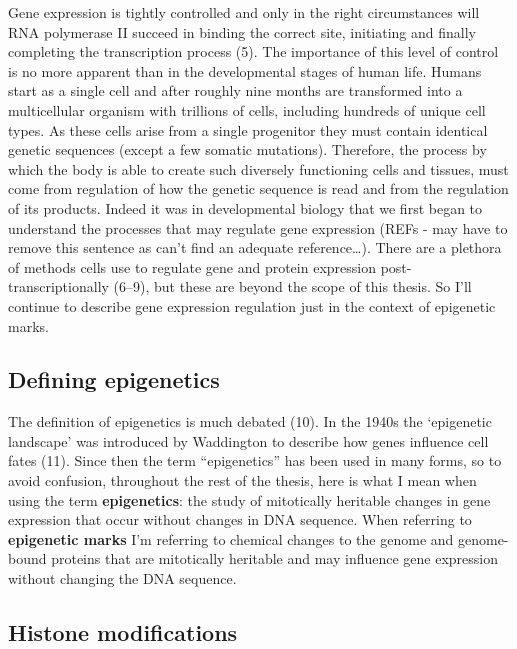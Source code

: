 \documentclass[11pt,twoside]{bristolthesis}
\begin{document}
Gene expression is tightly controlled and only in the right circumstances will RNA polymerase II succeed in binding the correct site, initiating and finally completing the transcription process (5). The importance of this level of control is no more apparent than in the developmental stages of human life. Humans start as a single cell and after roughly nine months are transformed into a multicellular organism with trillions of cells, including hundreds of unique cell types. As these cells arise from a single progenitor they must contain identical genetic sequences (except a few somatic mutations). Therefore, the process by which the body is able to create such diversely functioning cells and tissues, must come from regulation of how the genetic sequence is read and from the regulation of its products. Indeed it was in developmental biology that we first began to understand the processes that may regulate gene expression (REFs - may have to remove this sentence as can't find an adequate reference\ldots). There are a plethora of methods cells use to regulate gene and protein expression post-transcriptionally (6--9), but these are beyond the scope of this thesis. So I'll continue to describe gene expression regulation just in the context of epigenetic marks.

\hypertarget{defining-epigenetics}{%
\subsection{Defining epigenetics}\label{defining-epigenetics}}

The definition of epigenetics is much debated (10). In the 1940s the `epigenetic landscape' was introduced by Waddington to describe how genes influence cell fates (11). Since then the term ``epigenetics'' has been used in many forms, so to avoid confusion, throughout the rest of the thesis, here is what I mean when using the term \textbf{epigenetics}: the study of mitotically heritable changes in gene expression that occur without changes in DNA sequence. When referring to \textbf{epigenetic marks} I'm referring to chemical changes to the genome and genome-bound proteins that are mitotically heritable and may influence gene expression without changing the DNA sequence.

\hypertarget{histone-modifications}{%
\subsection{Histone modifications}\label{histone-modifications}}
\end{document}
